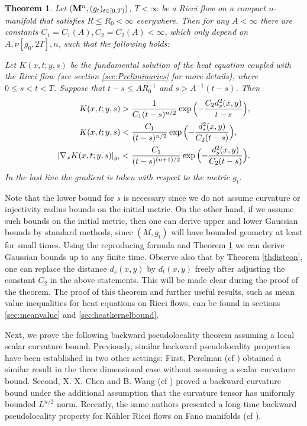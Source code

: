 \documentclass[11pt]{amsart}
\numberwithin{equation}{section}
\newtheorem{theorem}{Theorem}[section]
\def\al{\aligned}
\def\eal{\endaligned}
\def\M{{\bf M}}
\def\al{\aligned}
\numberwithin{equation}{section}
\begin{document}
\begin{theorem} \label{thkernelUP} 
Let $(\M^n, (g_t)_{t \in [0,T)})$, $T < \infty$ be a Ricci flow on a compact $n$-manifold that satisfies $R \leq R_0 < \infty$ everywhere.
Then for any $A < \infty$ there are constants $C_1 = C_1(A), C_2 = C_2(A) < \infty$, which only depend on $A, \nu[g_0, 2T], n$, such that the following holds:

Let $K(x, t; y, s)$ be the fundamental solution of the heat equation coupled with the Ricci flow (see section \ref{sec:Preliminaries} for more details), where $0 \leq s < t < T$.
Suppose that $t-s \leq A R_0^{-1}$ and $s > A^{-1} (t-s)$.
Then
\[
\al  
K(x, t; y, s) &> \frac{1}{C_1(t-s)^{n/2}} \exp \Big( {- \frac{C_2 d^2_s (x, y)}{t-s}} \Big), \\
K(x, t; y, s) &< \frac{C_1}{(t-s)^{n/2}} \exp \Big({ - \frac{d^2_s (x, y)}{C_2 (t-s)}} \Big),\\
 |\nabla_x K(x, t; y, s) |_{g_t} &<
\frac{C_1}{(t-s)^{(n+1)/2}} \exp \Big( {- \frac{d^2_s (x, y)}{C_2 (t-s)}} \Big). \eal
\] 
In the last line the gradient is taken with respect to the metric $g_t$.
\end{theorem}

Note that the lower bound for $s$ is necessary since we do not assume curvature or injectivity radius bounds on the initial metric.
On the other hand, if we assume such bounds on the initial metric, then one can derive upper and lower Gaussian bounds by standard methods, since $(M, g_t)$ will have bounded geometry at least for small times.
Using the reproducing formula and Theorem \ref{thkernelUP} we can derive Gaussian bounds up to any finite time.
Observe also that by Theorem \ref{thdistcon}, one can replace the distance $d_s (x, y)$ by $d_t (x, y)$ freely after adjusting the constant $C_2$ in the above statements.
This will be made clear during the proof of the theorem.
The proof of this theorem and further useful results, such as mean value inequalities for heat equations on Ricci flows, can be found in sections \ref{sec:meanvalue} and \ref{sec:heatkernelbound}.

Next, we prove the following backward pseudolocality theorem assuming a local scalar curvature bound.
Previously, similar backward pseudolocality properties have been established in two other settings:
First, Perelman (cf \cite[Proposition 6.4]{P:2}) obtained a similar result in the three dimensional case without assuming a scalar curvature bound. 
Second, X. X. Chen and B. Wang (cf \cite{CW:1}) proved a backward curvature bound under the additional assumption that the curvature tensor has uniformly bounded $L^{n/2}$ norm. 
Recently, the same authors presented a long-time backward pseudolocality property for K\"ahler Ricci flows on Fano manifolds (cf \cite{CW:3}).
\end{document}
